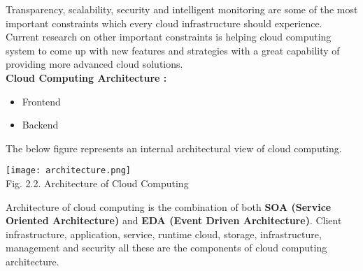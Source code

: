 \documentclass[12pt,a4paper]{article}
\begin{document}
Transparency, scalability, security and intelligent monitoring are some of the most important constraints which every cloud infrastructure should experience. Current research on other important constraints is helping cloud computing system to come up with new features and strategies with a great capability of providing more advanced cloud solutions.\\

\textbf{Cloud Computing Architecture :}
\begin{itemize}
\item Frontend
\item Backend
\end{itemize}
The below figure represents an internal architectural view of cloud computing.\\
\begin{center}
\texttt{[image: architecture.png]}\\
Fig. 2.2. Architecture of Cloud Computing
\end{center}
Architecture of cloud computing is the combination of both \textbf{SOA (Service Oriented Architecture)} and \textbf{EDA (Event Driven Architecture)}. Client infrastructure, application, service, runtime cloud, storage, infrastructure, management and security all these are the components of cloud computing architecture.\\
\end{document}
